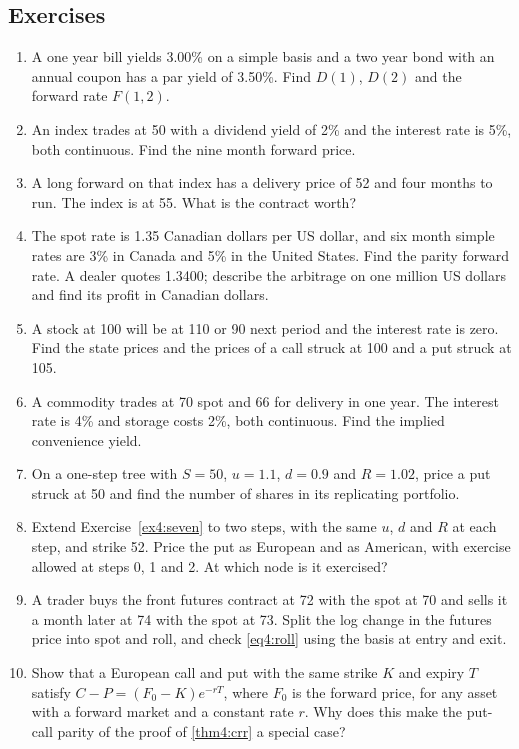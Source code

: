 \begin{chapterrefs}
\section{Exercises}
\label{sec4:exercises}

\begin{enumerate}[label=\textbf{4.\arabic*}, leftmargin=*, ref=4.\arabic*]
  \item\label{ex4:one} A one year bill yields 3.00\% on a simple basis and a two year bond with an
  annual coupon has a par yield of 3.50\%. Find $D(1)$, $D(2)$ and the forward rate $F(1,2)$.
  \item\label{ex4:two} An index trades at 50 with a dividend yield of 2\% and the interest rate is 5\%,
  both continuous. Find the nine month forward price.
  \item\label{ex4:three} A long forward on that index has a delivery price of 52 and four months to run.
  The index is at 55. What is the contract worth?
  \item\label{ex4:four} The spot rate is 1.35 Canadian dollars per US dollar, and six month simple rates
  are 3\% in Canada and 5\% in the United States. Find the parity forward rate. A dealer quotes 1.3400;
  describe the arbitrage on one million US dollars and find its profit in Canadian dollars.
  \item\label{ex4:five} A stock at 100 will be at 110 or 90 next period and the interest rate is zero.
  Find the state prices and the prices of a call struck at 100 and a put struck at 105.
  \item\label{ex4:six} A commodity trades at 70 spot and 66 for delivery in one year. The interest rate is
  4\% and storage costs 2\%, both continuous. Find the implied convenience yield.
  \item\label{ex4:seven} On a one-step tree with $S=50$, $u=1.1$, $d=0.9$ and $R=1.02$, price a put struck
  at 50 and find the number of shares in its replicating portfolio.
  \item\label{ex4:eight} Extend Exercise~\ref{ex4:seven} to two steps, with the same $u$, $d$ and $R$
  at each step, and strike 52. Price the put as European and as American, with exercise allowed at
  steps 0, 1 and 2. At which node is it exercised?
  \item\label{ex4:nine} A trader buys the front futures contract at 72 with the spot at 70 and sells it a
  month later at 74 with the spot at 73. Split the log change in the futures price into spot and roll, and check
  \cref{eq4:roll} using the basis at entry and exit.
  \item\label{ex4:ten} Show that a European call and put with the same strike $K$ and expiry $T$ satisfy
  $C-P=(F_0-K)e^{-rT}$, where $F_0$ is the forward price, for any asset with a forward market and a
  constant rate $r$. Why does this make the put-call parity of the proof of \cref{thm4:crr} a special
  case?
\end{enumerate}


\end{chapterrefs}
